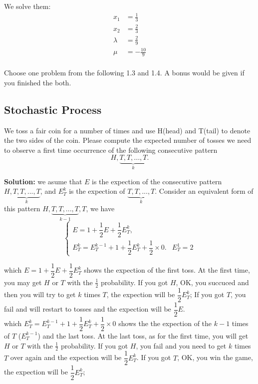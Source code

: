\documentclass[a4paper]{article}
\begin{document}
We solve them: 
\begin{equation}
    \begin{aligned}
        x_1 &= \frac{1}{3}\\
        x_2 &= \frac{2}{3}\\
        \lambda &= \frac{2}{9}\\
        \mu &= -\frac{10}{9}\\
    \end{aligned}
\end{equation}  

Choose one problem from the following 1.3 and 1.4. A bonus would be given if
you finished the both.

\subsection{Stochastic Process}
We toss a fair coin for a number of times and use H(head) and T(tail) to denote the two sides of the coin. Please compute the expected number of tosses we need to observe a first time occurrence of the following consecutive pattern
\begin{equation}
    H,\underbrace{T,T,...,T}_{k}.
\end{equation}

\textbf{Solution:} we asume that $E$ is the expection of the consecutive pattern $H,\underbrace{T,T,...,T}_{k}$, and $E_{T}^{k}$ is the   expection of $\underbrace{T,T,...,T}_{k}$. Consider an equivalent form of this pattern $H,\underbrace{T,T,...,T}_{k-1},T$, we have 
\begin{equation}  
\left\{  
             \begin{array}{lr}  
             E = 1 + \dfrac{1}{2}E +  \dfrac{1}{2}E_{T}^{k}, &  \\  
             E_{T}^{k} = E_{T}^{k-1} + 1 + \dfrac{1}{2}E_{T}^{k} + \dfrac{1}{2} \times 0. &   E_{T}^{1} =2   
             \end{array}  
\right.  
\end{equation}  

which $E = 1 + \dfrac{1}{2}E +  \dfrac{1}{2}E_{T}^{k}$ shows the expection of the first toss. At the first time, you may get $H$ or $T$ with the  $\frac{1}{2}$ probability. If you got $H$, OK, you succuced and then you will try to get $k$ times $T$, the expection will be $\dfrac{1}{2}E_{T}^{k}$; If you got $T$, you fail and will restart to tosses and the expection will be $\dfrac{1}{2}E$. \\
which $ E_{T}^{k} = E_{T}^{k-1} + 1 + \dfrac{1}{2}E_{T}^{k} + \dfrac{1}{2} \times 0$ shows the the expection of the $k-1$ times of $T$ ($E_{T}^{k-1}$) and the last toss. At the last toss, as for the first time, you will get $H$ or $T$ with the  $\frac{1}{2}$ probability. If you got $H$, you fail and you need to get $k$ times $T$ over again and the expection will be $\dfrac{1}{2}E_{T}^{k}$. If you got $T$, OK, you win the game, the expection will be $\dfrac{1}{2}E_{T}^{k}$; 
\end{document}

